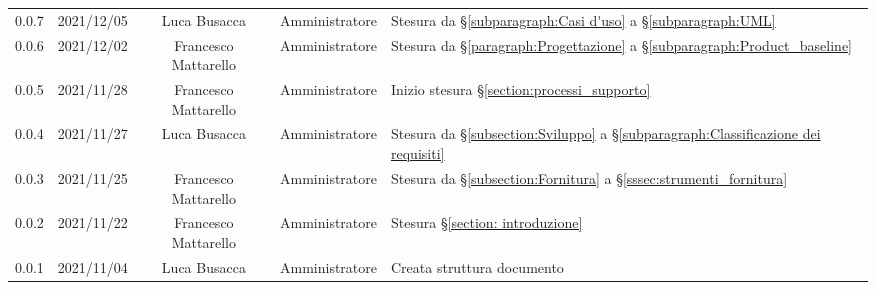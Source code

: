 \begin{center}
\begin{longtable}[c]{c | c | c | c | p{5cm}}
		0.0.7                                                      & 2021/12/05 & Luca Busacca                         & Amministratore & Stesura da  §\ref{subparagraph:Casi d'uso} a §\ref{subparagraph:UML}                                                                      \\
		0.0.6                                                      & 2021/12/02 & Francesco Mattarello                 & Amministratore & Stesura da  §\ref{paragraph:Progettazione} a §\ref{subparagraph:Product_baseline}                                                         \\
		0.0.5                                                      & 2021/11/28 & Francesco Mattarello                 & Amministratore & Inizio stesura §\ref{section:processi_supporto}                                                                                           \\
		0.0.4                                                      & 2021/11/27 & Luca Busacca                         & Amministratore & Stesura da §\ref{subsection:Sviluppo} a  §\ref{subparagraph:Classificazione dei requisiti}                                                \\
		0.0.3                                                      & 2021/11/25 & Francesco Mattarello                 & Amministratore & Stesura da §\ref{subsection:Fornitura} a §\ref{sssec:strumenti_fornitura}                                                                 \\
		0.0.2                                                      & 2021/11/22 & Francesco Mattarello                 & Amministratore & Stesura §\ref{section: introduzione}                                                                                                      \\
		0.0.1                                                      & 2021/11/04 & Luca Busacca                         & Amministratore & Creata struttura documento                                                                                                                \\
	\end{longtable}
\end{center}
